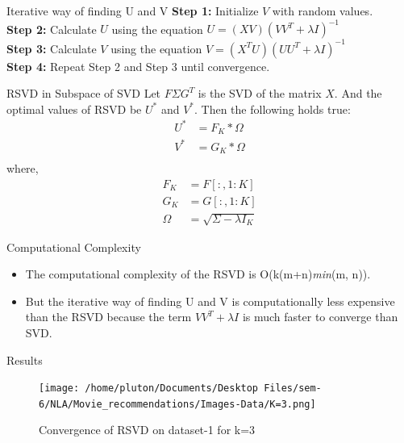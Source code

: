 \documentclass{beamer}
\begin{document}
\begin{frame}{Iterative way of finding U and V}
    \textbf{Step 1:} Initialize $V$ with random values.\\
    \textbf{Step 2:} Calculate $U$ using the equation $U = (XV)(VV^T + \lambda I)^{-1}$\\
    \textbf{Step 3:} Calculate $V$ using the equation $V = (X^TU)(UU^T + \lambda I)^{-1}$\\
    \textbf{Step 4:} Repeat Step 2 and Step 3 until convergence.\\
\end{frame}

\begin{frame}{RSVD in Subspace of SVD}
    Let $F \Sigma G^{T}$ is the SVD of the matrix $X$. And the optimal values of RSVD be $U^*$ and $V^*$. Then the following holds true:\\
    \begin{align}
            U^* &= F_K * \Omega\\
            V^* &= G_K * \Omega\\
    \end{align}
    where,
    \begin{align}
        F_K &= F[:, 1:K]\\
        G_K &= G[:, 1:K]\\
        \Omega &= \sqrt{\Sigma - \lambda I_K}
    \end{align}
\end{frame}

\begin{frame}{Computational Complexity}
    \begin{itemize}
        \item The computational complexity of the RSVD is O(k(m+n)\emph{min}(m, n)).
        \item But the iterative way of finding U and V is computationally less expensive than the RSVD because the term $VV^T + \lambda I$ is much faster to converge than SVD.
    \end{itemize}
\end{frame}

\begin{frame}{Results}
    \begin{figure}[htp]
    \texttt{[image: /home/pluton/Documents/Desktop Files/sem-6/NLA/Movie\_recommendations/Images-Data/K=3.png]}
    \caption{Convergence of RSVD on dataset-1 for k=3}
    \end{figure}
\end{frame}
\end{document}
